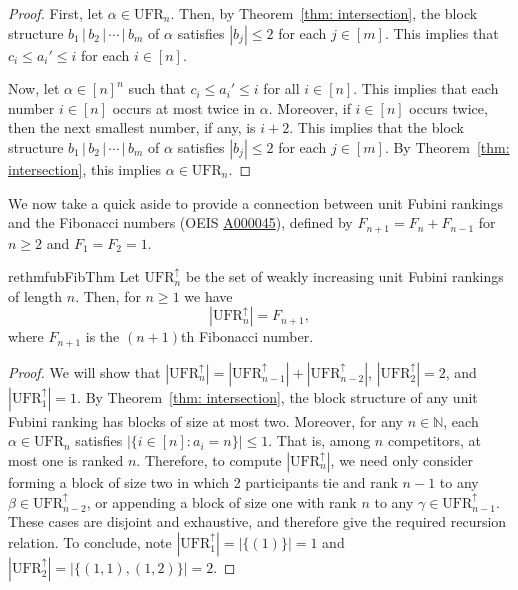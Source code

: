 \documentclass[11pt,reqno]{amsart}
\newcommand{\N}{\mathbb{N}}
\newcommand{\ufr}[1]{\mathrm{UFR}_{#1}}
\begin{document}
\begin{proof}
First, let $\alpha \in \ufr{n}$. 
Then, by Theorem~\ref{thm: intersection}, the block structure $b_1 \,|\, b_2 \,|\, \cdots \,|\, b_m$ of $\alpha$ satisfies $|b_j| \leq 2$ for each $j \in [m]$.
This implies that $c_i \leq a_i' \leq i$ for each $i \in [n]$.   

Now, let $\alpha \in [n]^n$ such that $c_i \leq a_i' \leq i$ for all $i \in [n]$. 
This implies that each number $i \in [n]$ occurs at most twice in $\alpha$.
Moreover, if $i \in [n]$ occurs twice, then the next smallest number, if any, is $i+2$. 
This implies that the block structure $b_1 \,|\, b_2 \,|\, \cdots \,|\, b_m$ of $\alpha$ satisfies $|b_j| \leq 2$ for each $j \in [m]$.
By Theorem~\ref{thm: intersection}, this implies $\alpha \in \ufr{n}$. 
\end{proof}

We now take a quick aside to provide a connection between unit Fubini rankings and the Fibonacci numbers (OEIS \href{https://oeis.org/A000045}{A000045}), defined by $F_{n+1}=F_{n}+F_{n-1}$ for $n\geq 2$ and $F_1=F_2=1$.
\begin{restatable}{rethm}{fubFibThm}
\label{thm:fubFib}
Let $\ufr{n}^{\uparrow}$ be the set of weakly increasing unit Fubini rankings of length $n$. 
Then, for $n \geq 1$ we have
\begin{equation*}
    |\ufr{n}^{\uparrow}|=F_{n+1},
\end{equation*}
where $F_{n+1}$ is the $(n+1)$th Fibonacci number.
\end{restatable}
\begin{proof}
We will show that $|\ufr{n}^{\uparrow}|=|\ufr{n-1}^{\uparrow}|+|\ufr{n-2}^{\uparrow}|$, $|\ufr{2}^{\uparrow}| = 2$, and $|\ufr{1}^{\uparrow}|= 1$.
By Theorem~\ref{thm: intersection}, the block structure of any unit Fubini ranking has blocks of size at most two. 
Moreover, for any $n \in \N$, each $\alpha \in \ufr{n}$ satisfies $|\{i \in [n]: a_i = n\}| \leq 1$.
That is, among $n$ competitors, at most one is ranked $n$.
Therefore, to compute $|\ufr{n}^{\uparrow}|$, we need only consider forming a block of size two in which 2 participants tie and rank $n-1$ to any $\beta \in \ufr{n-2}^{\uparrow}$, or appending a block of size one with rank $n$ to any $\gamma \in \ufr{n-1}^{\uparrow}$.
These cases are disjoint and exhaustive, and therefore give the required recursion relation.
To conclude, note $|\ufr{1}^{\uparrow}|=|\{(1)\}|=1$ and 
$|\ufr{2}^{\uparrow}|=|\{(1,1),(1,2)\}|=2$.
\end{proof}
\end{document}
